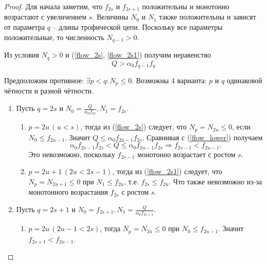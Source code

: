     \begin{proof}
        Для начала заметим, что \(f_{2s}\) и \(f_{2s+1}\) положительны и монотонно возрастают с увеличением \(s\). Величины \(N_0\) и \(N_1\) также положительны и зависят от параметра \(q\) -- длины трофической цепи.  
        Поскольку все параметры положительные, то численность \( N_{q-1} > 0 \).

        Из условия \( N_q > 0 \) и (\ref{flow_2s}, \ref{flow_2s1}) получим неравенство
        \begin{equation} \label{flow_lower}
            Q > \alpha_0 f_{q-1} f_{q}
        \end{equation} 

        Предположим противное: \(\exists p < q : N_p \leq 0\). Возможны 4 варианта: \(p\) и \(q\) одинаковой чётности и разной чётности.

        \begin{enumerate}
            \item Пусть \(q = 2s \) и \( N_0 = \frac{Q}{\alpha_0 f_{2s}}, N_1 = f_{2s}\).
            \begin{enumerate}
                \item \(p = 2u \, (u < s)\), тогда из (\ref{flow_2s}) следует, что \( N_p = N_{2u} \leq 0 \), если \(N_0 \leq f_{2u-1}\). Значит \(Q \leq \alpha_0 f_{2u-1} f_{2s} \). Сравнивая с (\ref{flow_lower}) получаем
                \begin{equation*}
                    \alpha_0 f_{2s-1} f_{2s} < Q \leq \alpha_0 f_{2u-1} f_{2s} \Rightarrow f_{2s-1} < f_{2u-1}.
                \end{equation*}
                Это невозможно, поскольку \(f_{2s-1}\) монотонно возрастает с ростом \(s\).

                \item \(p = 2u+1 \, (2u < 2s-1)\), тогда из (\ref{flow_2s1}) следует, что \( N_p = N_{2u+1} \leq 0 \) при \(N_1 \leq f_{2u}\), т.е. \(f_{2s} \leq f_{2u} \). Что также невозможно из-за монотонного возрастания \(f_{2s}\) с ростом \(s\). 
            \end{enumerate}

            \item Пусть \( q = 2s+1 \) и \( N_0 = f_{2s+1}, N_1 = \frac{Q}{\alpha_0 f_{2s+1}}\).
            \begin{enumerate}
                \item \(p = 2u \, (2u-1 < 2s)\), тогда \( N_p = N_{2u} \leq 0 \) при \(N_0 \leq f_{2u-1}\). Значит \(f_{2s+1} < f_{2u-1} \). 
                

\end{enumerate}
\end{enumerate}
\end{proof}
